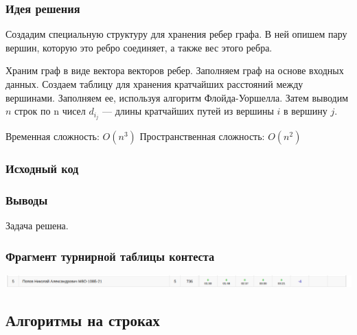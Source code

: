 \subsubsection*{Идея решения}

Создадим специальную структуру для хранения ребер графа. В ней 
опишем пару вершин, которую это ребро соединяет, а также вес
этого ребра.

Храним граф в виде вектора векторов ребер. Заполняем граф на основе входных данных. Создаем таблицу для хранения кратчайших 
расстояний между вершинами. Заполняем ее, используя алгоритм
Флойда-Уоршелла. Затем выводим $n$ строк по n чисел $d_i_j$ — длины кратчайших путей из вершины $i$ в вершину $j$.

\newline
Временная сложность: $O(n^3)$ \newline
Пространственная сложность: $O(n^2)$
\newline

\subsubsection*{Исходный код}


\subsubsection*{Выводы}
Задача решена.
\newline

\subsubsection*{Фрагмент турнирной таблицы контеста}
\begin{center}
\includegraphics[width=\textwidth]{standings/Contest8.png}\newline\noindent
\end{center}



\subsection*{Алгоритмы на строках}

